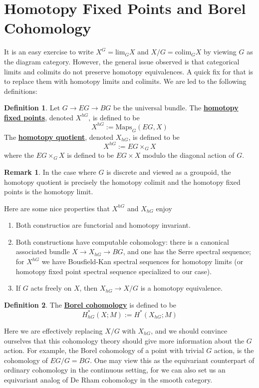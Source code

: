 \documentclass{article}
\theoremstyle{definition}
\theoremstyle{definition}
\newtheorem{definition}{Definition}[theorem]
\theoremstyle{definition}
\newtheorem{remark}{Remark}[theorem]
\theoremstyle{definition}
\theoremstyle{definition}
\theoremstyle{definition}
\theoremstyle{definition}
\begin{document}
\section{Homotopy Fixed Points and Borel Cohomology}
It is an easy exercise to write $X^G=\textrm{lim}_G X$ and $X/G=\textrm{colim}_G X$ by viewing $G$ as the diagram category. However, the general issue observed is that categorical limits and colimits do not preserve homotopy equivalences. A quick fix for that is to replace them with homotopy limits and colimits. We are led to the following definitions:
\begin{tcolorbox}[colback=purple!5!white,colframe=purple!75!black]
\begin{definition}
Let $G\to EG\to BG$ be the universal bundle. The \underline{\textbf{homotopy fixed points}}, denoted $X^{hG}$, is defined to be 
\[X^{hG}:=\textrm{Maps}_G(EG,X)\]
The \underline{\textbf{homotopy quotient}}, denoted $X_{hG}$, is defined to be 
\[X^{hG}:=EG\times_G X\]
where the $EG\times_G X$ is defined to be $EG\times X$ modulo the diagonal action of $G$.
\end{definition}
\end{tcolorbox}

\begin{tcolorbox}[colback=green!5!white,colframe=green!30!white]
\begin{remark}
    In the case where $G$ is discrete and viewed as a groupoid, the homotopy quotient is precisely the homotopy colimit and the homotopy fixed points is the homotopy limit. 
\end{remark}
\end{tcolorbox}
Here are some nice properties that $X^{hG}$ and $X_{hG}$ enjoy
\begin{enumerate}
    \item Both constructios are functorial and homotopy invariant. 
    \item Both constructions have computable cohomology: there is a canonical associated bundle $X\to X_{hG}\to BG$, and one has the Serre spectral sequence; for $X^{hG}$ we have Bousfield-Kan spectral sequences for homotopy limits (or homotopy fixed point spectral sequence specialized to our case). 
    \item If $G$ acts freely on $X$, then $X_{hG}\to X/G$ is a homotopy equivalence.  
\end{enumerate}

\begin{tcolorbox}[colback=purple!5!white,colframe=purple!75!black]
\begin{definition}
The \underline{\textbf{Borel cohomology}} is defined to be 
\[H^*_{hG}(X;M):= H^*(X_{hG}; M)\]
\end{definition}
\end{tcolorbox}
Here we are effectively replacing $X/G$ with $X_{hG}$, and we should convince ourselves that this cohomology theory should give more information about the $G$ action. For example, the Borel cohomology of a point with trivial $G$ action, is the cohomology of $EG/G=BG$. One may view this as the equivariant counterpart of ordinary cohomology in the continuous setting, for we can also set us an equivariant analog of De Rham cohomology in the smooth category. 
\end{document}
